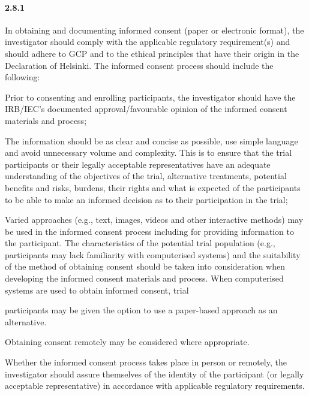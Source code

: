 \documentclass[11pt]{article}
\begin{document}
\paragraph{2.8.1} In obtaining and documenting informed consent (paper or electronic format), the investigator should comply with the applicable regulatory requirement(s) and should adhere to GCP and to the ethical principles that have their origin in the Declaration of Helsinki. The informed consent process should include the following:

\begin{description}[leftmargin=2.5cm,style=sameline]

\item[(a)] Prior to consenting and enrolling participants, the investigator should have the IRB/IEC's documented approval/favourable opinion of the informed consent materials and process;

\item[(b)] The information should be as clear and concise as possible, use simple language and avoid unnecessary volume and complexity. This is to ensure that the trial participants or their legally acceptable representatives have an adequate understanding of the objectives of the trial, alternative treatments, potential benefits and risks, burdens, their rights and what is expected of the participants to be able to make an informed decision as to their participation in the trial;

\item[(c)] Varied approaches (e.g., text, images, videos and other interactive methods) may be used in the informed consent process including for providing information to the participant. The characteristics of the potential trial population (e.g., participants may lack familiarity with computerised systems) and the suitability of the method of obtaining consent should be taken into consideration when developing the informed consent materials and process. When computerised systems are used to obtain informed consent, trial

\end{description}

participants may be given the option to use a paper-based approach as an alternative.


\begin{description}[leftmargin=2.5cm,style=sameline]

\item[(d)] Obtaining consent remotely may be considered where appropriate.

\item[(e)] Whether the informed consent process takes place in person or remotely, the investigator should assure themselves of the identity of the participant (or legally acceptable representative) in accordance with applicable regulatory requirements.

\end{description}
\end{document}
